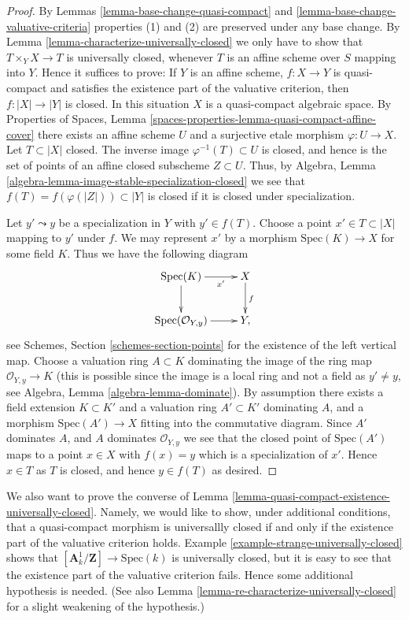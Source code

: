 \begin{proof}
By Lemmas \ref{lemma-base-change-quasi-compact}
and \ref{lemma-base-change-valuative-criteria}
properties (1) and (2) are preserved under
any base change. By Lemma \ref{lemma-characterize-universally-closed}
we only have to show that $T \times_Y X \to T$ is universally closed,
whenever $T$ is an affine scheme over $S$ mapping into $Y$. Hence it
suffices to prove: If $Y$ is an affine scheme, $f : X \to Y$ is quasi-compact
and satisfies the existence part of the valuative criterion, then
$f : |X| \to |Y|$ is closed. In this situation $X$ is a quasi-compact
algebraic space. By
Properties of Spaces,
Lemma \ref{spaces-properties-lemma-quasi-compact-affine-cover}
there exists an affine scheme $U$ and a surjective etale morphism
$\varphi : U \to X$. Let $T \subset |X|$ closed. The inverse image
$\varphi^{-1}(T) \subset U$ is closed, and hence is the set of points
of an affine closed subscheme $Z \subset U$. Thus, by
Algebra, Lemma \ref{algebra-lemma-image-stable-specialization-closed}
we see that $f(T) = f(\varphi(|Z|)) \subset |Y|$ is closed if it is
closed under specialization.

\medskip\noindent
Let $y' \leadsto y$ be a specialization in $Y$ with $y' \in f(T)$.
Choose a point $x' \in T \subset |X|$ mapping to $y'$ under $f$.
We may represent $x'$ by a morphism $\text{Spec}(K) \to X$
for some field $K$. Thus we have the following diagram
$$
\xymatrix{
\text{Spec}(K) \ar[r]_-{x'} \ar[d] & X \ar[d]^f \\
\text{Spec}(\mathcal{O}_{Y, y}) \ar[r] & Y,
}
$$
see
Schemes, Section \ref{schemes-section-points}
for the existence of the left vertical map.
Choose a valuation ring $A \subset K$ dominating the image of
the ring map $\mathcal{O}_{Y, y} \to K$ (this is possible since
the image is a local ring and not a field as $y' \not = y$, see
Algebra, Lemma \ref{algebra-lemma-dominate}).
By assumption there exists a field extension $K \subset K'$ and a
valuation ring $A' \subset K'$ dominating $A$, and a morphism
$\text{Spec}(A') \to X$ fitting into the commutative diagram.
Since $A'$ dominates $A$, and $A$ dominates $\mathcal{O}_{Y, y}$
we see that the closed point of $\text{Spec}(A')$ maps to
a point $x \in X$ with $f(x) = y$ which is a specialization of $x'$.
Hence $x \in T$ as $T$ is closed, and hence $y \in f(T)$ as desired.
\end{proof}

\noindent
We also want to prove the converse of
Lemma \ref{lemma-quasi-compact-existence-universally-closed}.
Namely, we would like to show, under additional conditions, that
a quasi-compact morphism is universallly closed if and only if
the existence part of the valuative criterion holds.
Example \ref{example-strange-universally-closed} shows that
$[\mathbf{A}^1_k/\mathbf{Z}] \to \text{Spec}(k)$ is universally
closed, but it is easy to see that the existence part of
the valuative criterion fails. Hence some
additional hypothesis is needed. (See also
Lemma \ref{lemma-re-characterize-universally-closed}
for a slight weakening of the hypothesis.)

